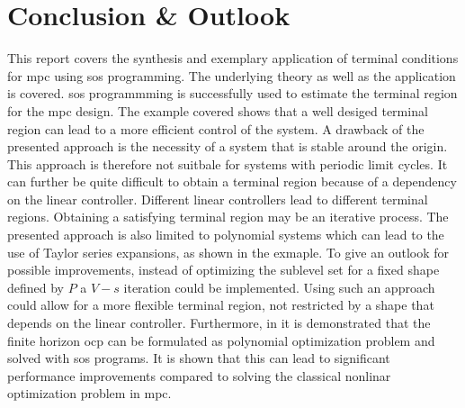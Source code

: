 \documentclass[10pt,a4paper,titlepage]{article}
\begin{document}
\newpage
\section{Conclusion \& Outlook}
\label{sec:conclusion}

This report covers the synthesis and exemplary application of terminal conditions for \gls{mpc} using \gls{sos} programming. The underlying theory as well as the 
application is covered. \gls{sos} programmming is successfully used to estimate the terminal region for the \gls{mpc} design. The example covered shows that a 
well desiged terminal region can lead to a more efficient control of the system. A drawback of the presented approach is the necessity of a system that is 
stable around the origin. This approach is therefore not suitbale for systems with periodic limit cycles. It can further be quite difficult to obtain a 
terminal region because of a dependency on the linear controller. Different linear controllers lead to different terminal regions. Obtaining a satisfying terminal
region may be an iterative process. The presented approach is also limited to polynomial systems which can lead to the use of Taylor series expansions, as 
shown in the exmaple. To give an outlook for possible improvements, instead of optimizing the sublevel set for a fixed shape defined by $P$ a $V-s$ iteration could be implemented. 
Using such an approach could allow for a more flexible terminal region, not restricted by a shape that depends on the linear controller. Furthermore, in \cite{RaffAllgoewer} it
is demonstrated that the finite horizon \gls{ocp} can be formulated as polynomial optimization problem and solved with \gls{sos} programs.
It is shown that this can lead to significant performance improvements compared to solving the classical nonlinar optimization problem in \gls{mpc}. 




\pagebreak




\end{document}
